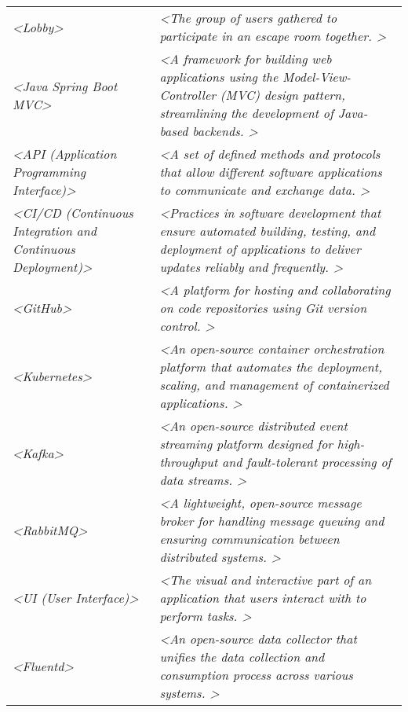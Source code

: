 \begin{longtable}[]{@{}
  >{\raggedright\arraybackslash}p{}
  >{\raggedright\arraybackslash}p{}@{}}
\emph{\textless Lobby\textgreater{}} & 
\emph{\textless The group of users gathered to participate in an escape room together. \textgreater{}} \\

\emph{\textless Java Spring Boot MVC\textgreater{}} & 
\emph{\textless A framework for building web applications using the Model-View-Controller (MVC) design pattern, streamlining the development of Java-based backends. \textgreater{}} \\

\emph{\textless API (Application Programming Interface)\textgreater{}} & 
\emph{\textless A set of defined methods and protocols that allow different software applications to communicate and exchange data. \textgreater{}} \\

\emph{\textless CI/CD (Continuous Integration and Continuous Deployment)\textgreater{}} & 
\emph{\textless Practices in software development that ensure automated building, testing, and deployment of applications to deliver updates reliably and frequently. \textgreater{}} \\

\emph{\textless GitHub\textgreater{}} & 
\emph{\textless A platform for hosting and collaborating on code repositories using Git version control. \textgreater{}} \\

\emph{\textless Kubernetes\textgreater{}} & 
\emph{\textless An open-source container orchestration platform that automates the deployment, scaling, and management of containerized applications. \textgreater{}} \\

\emph{\textless Kafka\textgreater{}} & 
\emph{\textless An open-source distributed event streaming platform designed for high-throughput and fault-tolerant processing of data streams. \textgreater{}} \\

\emph{\textless RabbitMQ\textgreater{}} & 
\emph{\textless A lightweight, open-source message broker for handling message queuing and ensuring communication between distributed systems. \textgreater{}} \\

\emph{\textless UI (User Interface)\textgreater{}} & 
\emph{\textless The visual and interactive part of an application that users interact with to perform tasks. \textgreater{}} \\

\emph{\textless Fluentd\textgreater{}} & 
\emph{\textless An open-source data collector that unifies the data collection and consumption process across various systems. \textgreater{}} \\


\end{longtable}
